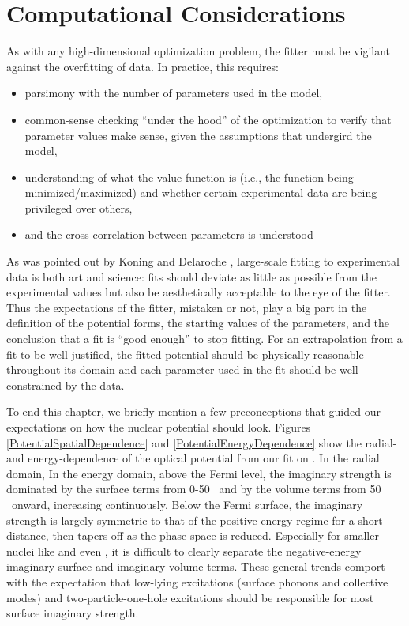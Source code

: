 \section{Computational Considerations}
As with any high-dimensional optimization problem, the fitter must be vigilant
against the overfitting of data. In practice, this requires:
\begin{itemize}
    \item parsimony with the number of parameters used in the model, 
    \item common-sense checking ``under the hood'' of the optimization to verify that
        parameter values make sense, given the assumptions that undergird the model,
    \item understanding of what the value function is (i.e., the function being
        minimized/maximized) and whether certain experimental data are being privileged over others,
    \item and the cross-correlation between parameters is understood
\end{itemize}
As was pointed out by Koning and Delaroche \cite{KoningDelaroche}, large-scale fitting to 
experimental data is both art and science: fits should deviate as little as possible from the 
experimental values but also be aesthetically acceptable to the eye of the fitter.
Thus the expectations of the fitter, mistaken or not, play a big part in the definition of the
potential forms, the starting values of the parameters, and the conclusion that a fit is ``good
enough'' to stop fitting. For an extrapolation from a
fit to be well-justified, the fitted potential should be physically reasonable throughout its domain
and each parameter used in the fit should be well-constrained by the data.

To end this chapter, we briefly mention a few preconceptions
that guided our expectations on how the nuclear potential should look. Figures
\ref{PotentialSpatialDependence} and \ref{PotentialEnergyDependence} show the radial- and
energy-dependence of the optical potential from our fit on \caForty.
In the radial domain, 
In the energy domain, above the Fermi level,
the imaginary strength is dominated by the surface terms from
0-50 \mega\electronvolt\ and by the volume terms from 50 \mega\electronvolt\ onward, increasing continuously.
Below the Fermi surface, the imaginary strength is largely symmetric to that of the positive-energy
regime for a short distance, then tapers off as the phase space is reduced. Especially for smaller
nuclei like \oSix and even \caForty, it is difficult to clearly separate the negative-energy 
imaginary surface and imaginary volume terms. These general trends comport with the expectation
that low-lying excitations (surface phonons and collective modes) and
two-particle-one-hole excitations should be responsible for most surface imaginary strength.

